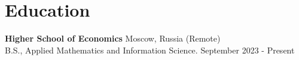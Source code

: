 \section{\sc Education}

\textbf{Higher School of Economics} \hfill Moscow, Russia (Remote) \\
B.S., Applied Mathematics and Information Science. \hfill September 2023 - Present\\

\endinput
